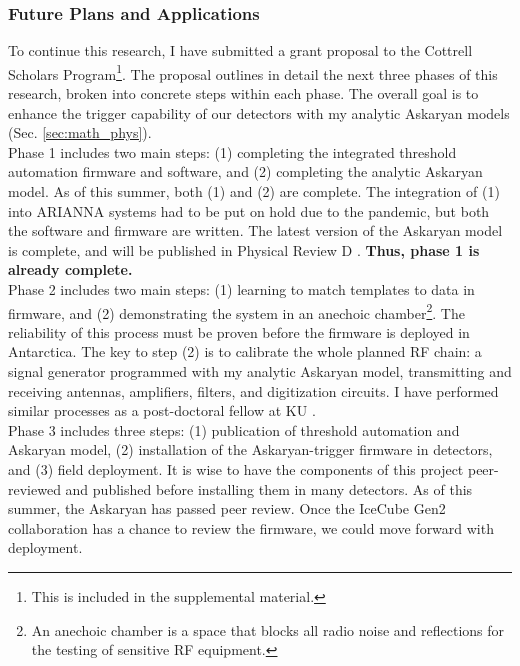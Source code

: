 \documentclass[../../../main.tex]{subfiles}
\begin{document}
\subsubsection{Future Plans and Applications}

To continue this research, I have submitted a grant proposal to the Cottrell Scholars Program\footnote{This is included in the supplemental material.}.  The proposal outlines in detail the next three phases of this research, broken into concrete steps within each phase.  The overall goal is to enhance the trigger capability of our detectors with my analytic Askaryan models (Sec. \ref{sec:math_phys}).
\\
\vspace{0.15cm}
Phase 1 includes two main steps: (1) completing the integrated threshold automation firmware and software, and (2) completing the analytic Askaryan model.  As of this summer, both (1) and (2) are complete.  The integration of (1) into ARIANNA systems had to be put on hold due to the pandemic, but both the software and firmware are written.  The latest version of the Askaryan model is complete, and will be published in Physical Review D \cite{time}.  \textbf{Thus, phase 1 is already complete.}
\\
\vspace{0.15cm}
Phase 2 includes two main steps: (1) learning to match templates to data in firmware, and (2) demonstrating the system in an anechoic chamber\footnote{An anechoic chamber is a space that blocks all radio noise and reflections for the testing of sensitive RF equipment.}.  The reliability of this process must be proven before the firmware is deployed in Antarctica.  The key to step (2) is to calibrate the whole planned RF chain: a signal generator programmed with my analytic Askaryan model, transmitting and receiving antennas, amplifiers, filters, and digitization circuits.  I have performed similar processes as a post-doctoral fellow at KU \cite{10.1016/j.astropartphys.2014.09.002}.
\\
\vspace{0.15cm}
Phase 3 includes three steps: (1) publication of threshold automation and Askaryan model, (2) installation of the Askaryan-trigger firmware in detectors, and (3) field deployment.  It is wise to have the components of this project peer-reviewed and published before installing them in many detectors.  As of this summer, the Askaryan has passed peer review.  Once the IceCube Gen2 collaboration has a chance to review the firmware, we could move forward with deployment.
\end{document}
